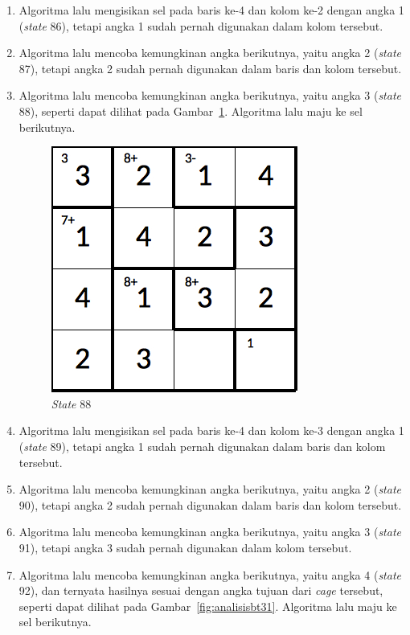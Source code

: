 \begin{enumerate}
\item Algoritma lalu mengisikan sel pada baris ke-4 dan kolom ke-2 dengan angka 1 (\textit{state} 86), tetapi angka 1 sudah pernah digunakan dalam kolom tersebut.
\item Algoritma lalu mencoba kemungkinan angka berikutnya, yaitu angka 2 (\textit{state} 87), tetapi angka 2 sudah pernah digunakan dalam baris dan kolom tersebut.
\item Algoritma lalu mencoba kemungkinan angka berikutnya, yaitu angka 3 (\textit{state} 88), seperti dapat dilihat pada Gambar~\ref{fig:analisisbt30}. Algoritma lalu maju ke sel berikutnya.

\begin{figure}
\centering
\captionsetup{justification=centering}
\includegraphics[scale=0.333]{Gambar/backtracking/State88}
\caption[\textit{State} 88]{\textit{State} 88}
\label{fig:analisisbt30}
\end{figure}

\item Algoritma lalu mengisikan sel pada baris ke-4 dan kolom ke-3 dengan angka 1 (\textit{state} 89), tetapi angka 1 sudah pernah digunakan dalam baris dan kolom tersebut.
\item Algoritma lalu mencoba kemungkinan angka berikutnya, yaitu angka 2 (\textit{state} 90), tetapi angka 2 sudah pernah digunakan dalam baris dan kolom tersebut.
\item Algoritma lalu mencoba kemungkinan angka berikutnya, yaitu angka 3 (\textit{state} 91), tetapi angka 3 sudah pernah digunakan dalam kolom tersebut.
\item Algoritma lalu mencoba kemungkinan angka berikutnya, yaitu angka 4 (\textit{state} 92), dan ternyata hasilnya sesuai dengan angka tujuan dari \textit{cage} tersebut, seperti dapat dilihat pada Gambar~\ref{fig:analisisbt31}. Algoritma lalu maju ke sel berikutnya.


\end{enumerate}
